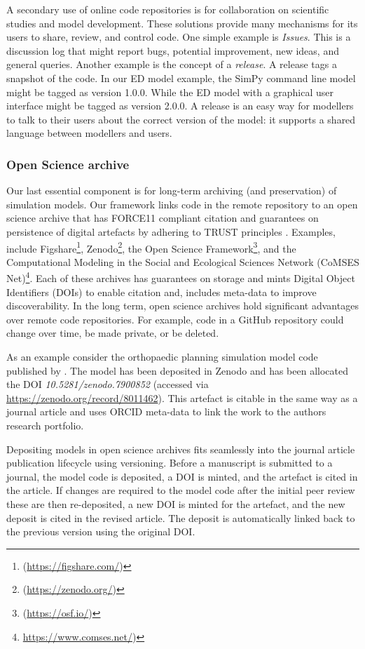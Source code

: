 \documentclass[]{interact}
\theoremstyle{plain}%
\theoremstyle{definition}
\theoremstyle{remark}
\begin{document}
A secondary use of online code repositories is for collaboration on scientific studies and model development. These solutions provide many mechanisms for its users to share, review, and control code. One simple example is \textit{Issues}. This is a discussion log that might report bugs, potential improvement, new ideas, and general queries. Another example is the concept of a \textit{release}. A release tags a snapshot of the code. In our ED model example, the SimPy command line model might be tagged as version 1.0.0. While the ED model with a graphical user interface might be tagged as version 2.0.0. A release is an easy way for modellers to talk to their users about the correct version of the model: it supports a shared language between modellers and users.

\subsubsection{Open Science archive}

 Our last essential component is for long-term archiving (and preservation) of simulation models. Our framework links code in the remote repository to an open science archive that has FORCE11 compliant citation \citep{smith_software_2016} and guarantees on persistence of digital artefacts by adhering to TRUST principles \citep{lin_trust_2020}. Examples, include Figshare\footnote{(\url{https://figshare.com/})}, Zenodo\footnote{(\url{https://zenodo.org/})}, the Open Science Framework\footnote{(\url{https://osf.io/})}, and the Computational Modeling in the Social and Ecological Sciences Network (CoMSES Net)\footnote{\url{https://www.comses.net/})}. Each of these archives has guarantees on storage and mints Digital Object Identifiers (DOIs) to enable citation and, includes meta-data to improve discoverability.  In the long term, open science archives hold significant advantages over remote code repositories. For example, code in a GitHub repository could change over time, be made private, or be deleted.
 
 As an example consider the orthopaedic planning simulation model code published by \cite{alison_harper_2023_8011462}. The model has been deposited in Zenodo and has been allocated the DOI \textit{10.5281/zenodo.7900852} (accessed via \url{https://zenodo.org/record/8011462}).  This artefact is citable in the same way as a journal article and uses ORCID meta-data to link the work to the authors research portfolio. 

Depositing models in open science archives fits seamlessly into the journal article publication lifecycle using versioning. Before a manuscript is submitted to a journal, the model code is deposited, a DOI is minted, and the artefact is cited in the article.  If changes are required to the model code after the initial peer review these are then re-deposited, a new DOI is minted for the artefact, and the new deposit is cited in the revised article.  The deposit is automatically linked back to the previous version using the original DOI. 
\end{document}

